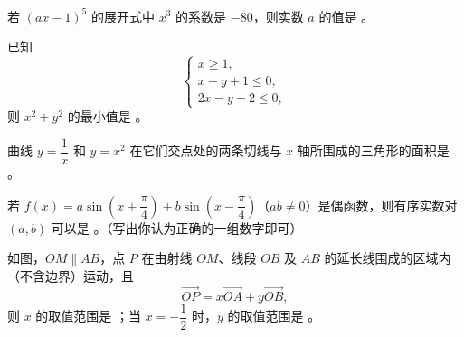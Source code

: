 \begin{question}
若 $(ax-1)^5$ 的展开式中 $x^3$ 的系数是 $-80$，则实数 $a$ 的值是 \gkblank{}。

\end{question}
\begin{question}
已知
\nopagebreak[4]
\[
\begin{cases}
x\ge1,\\
x-y+1\le0,\\
2x-y-2\le0,
\end{cases}
\]
则 $x^2+y^2$ 的最小值是 \gkblank{}。

\end{question}
\begin{question}
曲线 $y=\dfrac1x$ 和 $y=x^2$ 在它们交点处的两条切线与 $x$ 轴所围成的三角形的面积是 \gkblank{}。

\end{question}
\begin{question}
若 $f(x)=a\sin\left(x+\dfrac\pi4\right)+b\sin\left(x-\dfrac\pi4\right)$（$ab\ne0$）是偶函数，则有序实数对 $(a,b)$ 可以是 \gkblank{}。（写出你认为正确的一组数字即可）

\Needspace{0.4\textheight}
\end{question}
\begin{question}
如图，$OM\parallel AB$，点 $P$ 在由射线 $OM$、线段 $OB$ 及 $AB$ 的延长线围成的区域内（不含边界）运动，且
\nopagebreak[4]
\[
\overrightarrow{OP}=x\overrightarrow{OA}+y\overrightarrow{OB},
\]
则 $x$ 的取值范围是 \gkblank{}；当 $x=-\dfrac12$ 时，$y$ 的取值范围是 \gkblank{}。
\nopagebreak[4]
\begin{center}\end{center}
\nopagebreak[4]
\end{question}

